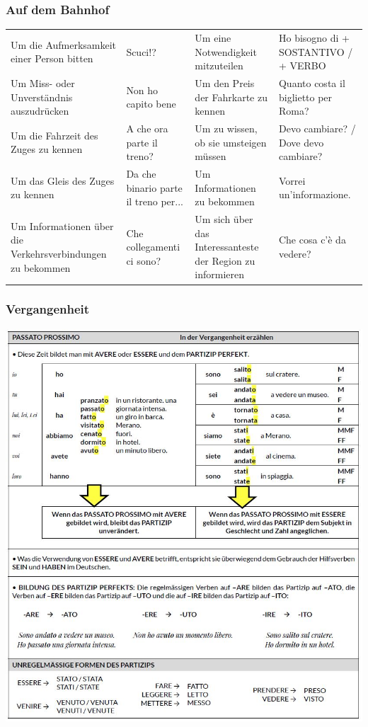 \documentclass[10pt]{scrartcl}
\begin{document}
\subsubsection*{Auf dem Bahnhof}
\begin{tabular}{p{4cm}p{4cm}p{4cm}p{4cm}}
Um die Aufmerksamkeit einer Person bitten & Scuci!? & Um eine Notwendigkeit mitzuteilen & Ho bisogno di + SOSTANTIVO / + VERBO\\
Um Miss- oder Unverständnis auszudrücken & Non ho capito bene & Um den Preis der Fahrkarte zu kennen & Quanto costa il biglietto per Roma? \\
Um die Fahrzeit des Zuges zu kennen & A che ora parte il treno? & Um zu wissen, ob sie umsteigen müssen & Devo cambiare? / Dove devo cambiare?\\
Um das Gleis des Zuges zu kennen & Da che binario parte il treno per... & Um Informationen zu bekommen & Vorrei un'informazione.\\
Um Informationen über die Verkehrsverbindungen zu bekommen & Che collegamenti ci sono? & Um sich über das Interessanteste der Region zu informieren & Che cosa c'è da vedere?\\
\end{tabular}
\clearpage
\subsubsection*{Vergangenheit}
\includegraphics[scale=.8]{images/vergangenheit.JPG}
\end{document}
